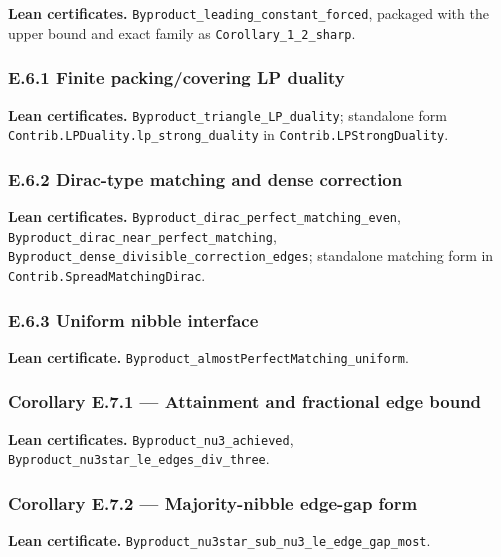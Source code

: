 \documentclass[english,11pt,a4paper]{article}
\begin{document}
\textbf{Lean certificates.}
\nolinkurl{Byproduct_leading_constant_forced}, packaged with the upper
bound and exact family as \nolinkurl{Corollary_1_2_sharp}.

\subsubsection{E.6.1 Finite packing/covering LP
duality}\label{e.6.1-finite-packingcovering-lp-duality}

\textbf{Lean certificates.} \nolinkurl{Byproduct_triangle_LP_duality};
standalone form \nolinkurl{Contrib.LPDuality.lp_strong_duality} in
\nolinkurl{Contrib.LPStrongDuality}.

\subsubsection{E.6.2 Dirac-type matching and dense
correction}\label{e.6.2-dirac-type-matching-and-dense-correction}

\textbf{Lean certificates.}
\nolinkurl{Byproduct_dirac_perfect_matching_even},
\nolinkurl{Byproduct_dirac_near_perfect_matching},
\nolinkurl{Byproduct_dense_divisible_correction_edges}; standalone
matching form in \nolinkurl{Contrib.SpreadMatchingDirac}.

\subsubsection{E.6.3 Uniform nibble
interface}\label{e.6.3-uniform-nibble-interface}

\textbf{Lean certificate.}
\nolinkurl{Byproduct_almostPerfectMatching_uniform}.

\subsubsection{Corollary E.7.1 --- Attainment and fractional edge
bound}\label{corollary-e.7.1-attainment-and-fractional-edge-bound}

\textbf{Lean certificates.} \nolinkurl{Byproduct_nu3_achieved},
\nolinkurl{Byproduct_nu3star_le_edges_div_three}.

\subsubsection{Corollary E.7.2 --- Majority-nibble edge-gap
form}\label{corollary-e.7.2-majority-nibble-edge-gap-form}

\textbf{Lean certificate.}
\nolinkurl{Byproduct_nu3star_sub_nu3_le_edge_gap_most}.
\end{document}
